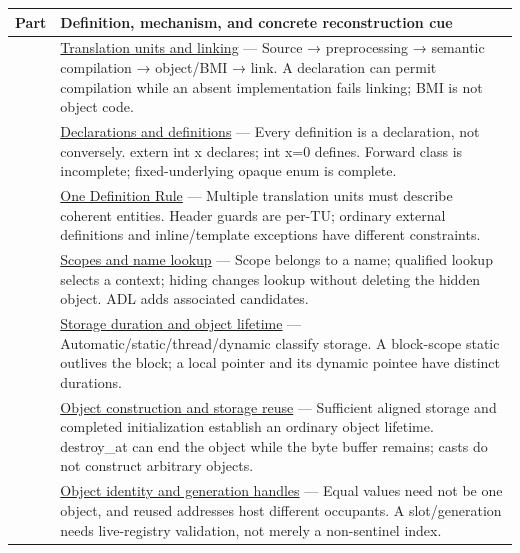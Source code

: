 {\def\LTcaptype{none} %
\begin{longtable}[]{@{}
  >{\raggedright\arraybackslash}p{}
  >{\raggedright\arraybackslash}p{}@{}}
\toprule\noalign{}
\begin{minipage}[b]{\linewidth}\raggedright
Part
\end{minipage} & \begin{minipage}[b]{\linewidth}\raggedright
Definition, mechanism, and concrete reconstruction cue
\end{minipage} \\
\midrule\noalign{}
\endhead
\bottomrule\noalign{}
\endlastfoot
101 & \hyperref[appendix-806686359e1b]{Translation units and linking} --- Source → preprocessing → semantic compilation → object/BMI → link. A declaration can permit compilation while an absent implementation fails linking; BMI is not object code. \\
102 & \hyperref[appendix-2e4d494c2d94]{Declarations and definitions} --- Every definition is a declaration, not conversely. extern int x declares; int x=0 defines. Forward class is incomplete; fixed-underlying opaque enum is complete. \\
103 & \hyperref[appendix-49d27bc9d9a5]{One Definition Rule} --- Multiple translation units must describe coherent entities. Header guards are per-TU; ordinary external definitions and inline/template exceptions have different constraints. \\
104 & \hyperref[appendix-b12b31759da1]{Scopes and name lookup} --- Scope belongs to a name; qualified lookup selects a context; hiding changes lookup without deleting the hidden object. ADL adds associated candidates. \\
105 & \hyperref[appendix-0b104bcba06b]{Storage duration and object lifetime} --- Automatic/static/thread/dynamic classify storage. A block-scope static outlives the block; a local pointer and its dynamic pointee have distinct durations. \\
106 & \hyperref[appendix-a82f9c438857]{Object construction and storage reuse} --- Sufficient aligned storage and completed initialization establish an ordinary object lifetime. destroy\_at can end the object while the byte buffer remains; casts do not construct arbitrary objects. \\
107 & \hyperref[appendix-f1581457d322]{Object identity and generation handles} --- Equal values need not be one object, and reused addresses host different occupants. A slot/generation needs live-registry validation, not merely a non-sentinel index. \\

\end{longtable}}
